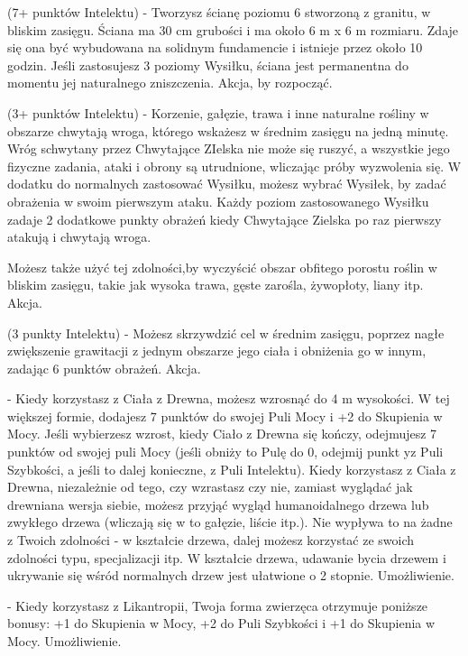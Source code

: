 { (7+ punktów Intelektu) - Tworzysz ścianę poziomu 6 stworzoną z granitu, w bliskim zasięgu. Ściana ma 30 cm grubości i ma około 6 m x 6 m rozmiaru. Zdaje się ona być wybudowana na solidnym fundamencie i istnieje przez około 10 godzin. Jeśli zastosujesz 3 poziomy Wysiłku, ściana jest permanentna do momentu jej naturalnego zniszczenia. Akcja, by rozpocząć. 

 (3+ punktów Intelektu) - Korzenie, gałęzie, trawa i inne naturalne rośliny w obszarze chwytają wroga, którego wskażesz w średnim zasięgu na jedną minutę. Wróg schwytany przez Chwytające ZIelska nie może się ruszyć, a wszystkie jego fizyczne zadania, ataki i obrony są utrudnione, wliczając próby wyzwolenia się. W dodatku do normalnych zastosować Wysiłku, możesz wybrać Wysiłek, by zadać obrażenia w swoim pierwszym ataku. Każdy poziom zastosowanego Wysiłku zadaje 2 dodatkowe punkty obrażeń kiedy Chwytające Zielska po raz pierwszy atakują i chwytają wroga. 

Możesz także użyć tej zdolności,by wyczyścić obszar obfitego porostu roślin w bliskim zasięgu, takie jak wysoka trawa, gęste zarośla, żywopłoty, liany itp. Akcja.

 (3 punkty Intelektu) - Możesz skrzywdzić cel w średnim zasięgu, poprzez nagłe zwiększenie grawitacji z jednym obszarze jego ciała i obniżenia go w innym, zadając 6 punktów obrażeń. Akcja.

 - Kiedy korzystasz z Ciała z Drewna, możesz wzrosnąć do 4 m wysokości. W tej większej formie, dodajesz 7 punktów do swojej Puli Mocy i +2 do Skupienia w Mocy. Jeśli wybierzesz wzrost, kiedy Ciało z Drewna się kończy, odejmujesz 7 punktów od swojej puli Mocy (jeśli obniży to Pulę do 0, odejmij punkt yz Puli Szybkości, a jeśli to dalej konieczne, z Puli Intelektu). Kiedy korzystasz z Ciała z Drewna, niezależnie od tego, czy wzrastasz czy nie, zamiast wyglądać jak drewniana wersja siebie, możesz przyjąć wygląd humanoidalnego drzewa lub zwykłego drzewa (wliczają się w to gałęzie, liście itp.). Nie wypływa to na żadne z Twoich zdolności - w kształcie drzewa, dalej możesz korzystać ze swoich zdolności typu, specjalizacji itp. W kształcie drzewa, udawanie bycia drzewem i ukrywanie się wśród normalnych drzew jest ułatwione o 2 stopnie. Umożliwienie.

 - Kiedy korzystasz z Likantropii, Twoja forma zwierzęca otrzymuje poniższe bonusy: +1 do Skupienia w Mocy, +2 do Puli Szybkości i +1 do Skupienia w Mocy. Umożliwienie.

}
